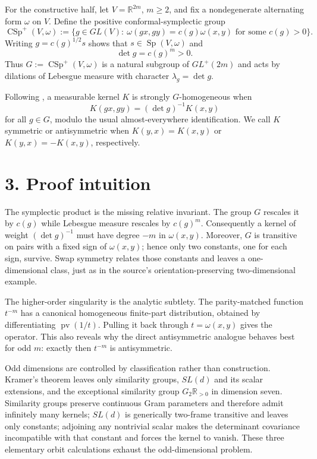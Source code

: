 \documentclass[11pt]{article}
\newcommand{\R}{\mathbb R}
\newcommand{\Sp}{\operatorname{Sp}}
\newcommand{\CSp}{\operatorname{CSp}^{+}}
\newcommand{\pv}{\operatorname{pv}}
\begin{document}
For the constructive half, let $V=\R^{2m}$, $m\geq2$, and fix a nondegenerate alternating form $\omega$ on $V$.  Define the positive conformal-symplectic group
\[
 \CSp(V,\omega)
 :=\{g\in GL(V):\ \omega(gx,gy)=c(g)\omega(x,y)\text{ for some }c(g)>0\}.
\]
Writing $g=c(g)^{1/2}s$ shows that $s\in\Sp(V,\omega)$ and
\begin{equation}\label{eq:det}
 \det g=c(g)^m>0.
\end{equation}
Thus $G:=\CSp(V,\omega)$ is a natural subgroup of $GL^+(2m)$ and acts by dilations of Lebesgue measure with character $\lambda_g=\det g$.

Following \cite{AK}, a measurable kernel $K$ is strongly $G$-homogeneous when
\begin{equation}\label{eq:kernel-hom}
 K(gx,gy)=(\det g)^{-1}K(x,y)
\end{equation}
for all $g\in G$, modulo the usual almost-everywhere identification.  We call $K$ symmetric or antisymmetric when $K(y,x)=K(x,y)$ or $K(y,x)=-K(x,y)$, respectively.

\section*{3. Proof intuition}

The symplectic product is the missing relative invariant.  The group $G$ rescales it by $c(g)$ while Lebesgue measure rescales by $c(g)^m$.  Consequently a kernel of weight $(\det g)^{-1}$ must have degree $-m$ in $\omega(x,y)$.  Moreover, $G$ is transitive on pairs with a fixed sign of $\omega(x,y)$; hence only two constants, one for each sign, survive.  Swap symmetry relates those constants and leaves a one-dimensional class, just as in the source's orientation-preserving two-dimensional example.

The higher-order singularity is the analytic subtlety.  The parity-matched function $t^{-m}$ has a canonical homogeneous finite-part distribution, obtained by differentiating $\pv(1/t)$.  Pulling it back through $t=\omega(x,y)$ gives the operator.  This also reveals why the direct antisymmetric analogue behaves best for odd $m$: exactly then $t^{-m}$ is antisymmetric.

Odd dimensions are controlled by classification rather than construction.  Kramer's theorem leaves only similarity groups, $SL(d)$ and its scalar extensions, and the exceptional similarity group $G_2\R_{>0}$ in dimension seven.  Similarity groups preserve continuous Gram parameters and therefore admit infinitely many kernels; $SL(d)$ is generically two-frame transitive and leaves only constants; adjoining any nontrivial scalar makes the determinant covariance incompatible with that constant and forces the kernel to vanish.  These three elementary orbit calculations exhaust the odd-dimensional problem.
\end{document}
